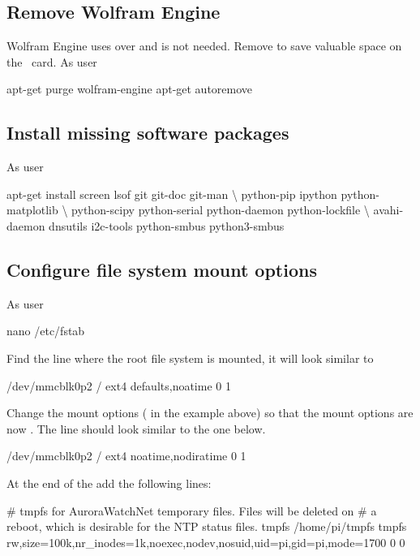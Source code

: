 \subsection{Remove Wolfram Engine}
Wolfram Engine uses over  and is not needed. Remove to save
valuable space on the \sd\ card. As user \rootUser
\begin{Cmd}
apt-get purge wolfram-engine
apt-get autoremove
\end{Cmd}


\subsection{Install missing software packages}
As user \rootUser
\begin{Cmd}
apt-get install screen lsof git git-doc git-man \textbackslash
    python-pip ipython python-matplotlib \textbackslash
    python-scipy python-serial python-daemon python-lockfile \textbackslash
    avahi-daemon dnsutils i2c-tools python-smbus python3-smbus
\end{Cmd}

\subsection{Configure file system mount options}

As user \rootUser
\begin{Cmd}
nano /etc/fstab  
\end{Cmd}

Find the line where the root file system is mounted, it will look
similar to
\begin{Cmd}
/dev/mmcblk0p2  /               ext4    defaults,noatime  0       1
\end{Cmd}
Change the mount options ( in the example
above) so that the mount options are now
. The line should look similar to the one
below.
\begin{Cmd}
/dev/mmcblk0p2  /               ext4    noatime,nodiratime  0       1
\end{Cmd}

At the end of the  add the following lines:
\begin{Cmd}[fontsize=\relsize{-2.5}]
# tmpfs for AuroraWatchNet temporary files. Files will be deleted on 
# a reboot, which is desirable for the NTP status files.
tmpfs  /home/pi/tmpfs  tmpfs  rw,size=100k,nr_inodes=1k,noexec,nodev,nosuid,uid=pi,gid=pi,mode=1700  0  0
\end{Cmd}

